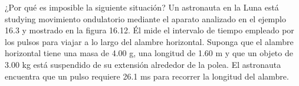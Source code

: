 \item ¿Por qué es imposible la siguiente situación? Un astronauta en la Luna está studying movimiento ondulatorio mediante el aparato analizado en el ejemplo 16.3 y mostrado en la figura 16.12. Él mide el intervalo de tiempo empleado por los pulsos para viajar a lo largo del alambre horizontal. Suponga que el alambre horizontal tiene una masa de 4.00 g, una longitud de 1.60 m y que un objeto de 3.00 kg está suspendido de su extensión alrededor de la polea. El astronauta encuentra que un pulso requiere 26.1 ms para recorrer la longitud del alambre.